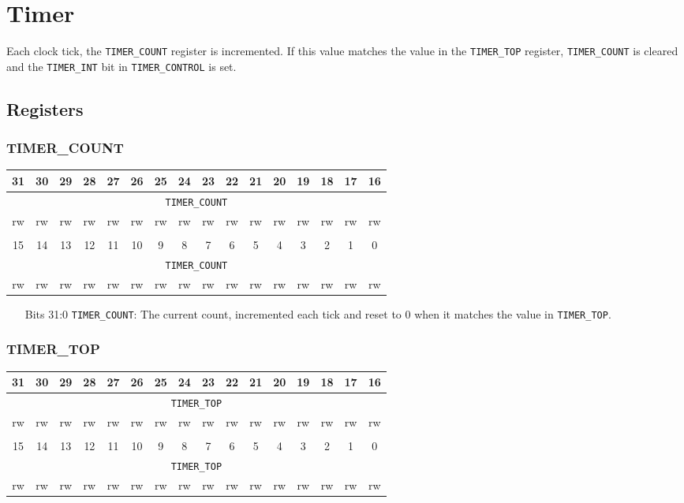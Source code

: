 \documentclass[11pt,openany]{report}
\begin{document}
\section{Timer}
Each clock tick, the \verb|TIMER_COUNT| register is incremented. If
this value matches the value in the \verb|TIMER_TOP| register,
\verb|TIMER_COUNT| is cleared and the \verb|TIMER_INT| bit in
\verb|TIMER_CONTROL| is set.

\subsection{Registers}
\subsubsection{TIMER\_COUNT}

\centering
\begin{tabular}{|c|c|c|c|c|c|c|c|c|c|c|c|c|c|c|c|}
  \hline
  31 & 30 & 29 & 28 & 27 & 26 & 25 & 24 & 23 & 22 & 21 & 20 & 19 & 18 & 17 & 16 \\
  \hline
  \multicolumn{16}{|c|}{\texttt{TIMER\_COUNT}}\\
  \hline
  rw & rw & rw & rw & rw & rw & rw & rw & rw & rw & rw & rw & rw & rw & rw & rw\\
  \hline
  \multicolumn{16}{c}{}\\
  \hline
  15 & 14 & 13 & 12 & 11 & 10 & 9 & 8 & 7 & 6 & 5 & 4 & 3 & 2 & 1 & 0 \\
  \hline
  \multicolumn{16}{|c|}{\texttt{TIMER\_COUNT}}\\
  \hline
  rw & rw & rw & rw & rw & rw & rw & rw & rw & rw & rw & rw & rw & rw & rw & rw\\
  \hline
\end{tabular}

\begin{enumerate}
\item[Bits 31:0] \verb|TIMER_COUNT|: The current count, incremented
  each tick and reset to 0 when it matches the value in
  \verb|TIMER_TOP|.
\end{enumerate}

\subsubsection{TIMER\_TOP}
\centering
\begin{tabular}{|c|c|c|c|c|c|c|c|c|c|c|c|c|c|c|c|}
  \hline
  31 & 30 & 29 & 28 & 27 & 26 & 25 & 24 & 23 & 22 & 21 & 20 & 19 & 18 & 17 & 16 \\
  \hline
  \multicolumn{16}{|c|}{\texttt{TIMER\_TOP}}\\
  \hline
  rw & rw & rw & rw & rw & rw & rw & rw & rw & rw & rw & rw & rw & rw & rw & rw\\
  \hline
  \multicolumn{16}{c}{}\\
  \hline
  15 & 14 & 13 & 12 & 11 & 10 & 9 & 8 & 7 & 6 & 5 & 4 & 3 & 2 & 1 & 0 \\
  \hline
  \multicolumn{16}{|c|}{\texttt{TIMER\_TOP}}\\
  \hline
  rw & rw & rw & rw & rw & rw & rw & rw & rw & rw & rw & rw & rw & rw & rw & rw\\
  \hline
\end{tabular}
\end{document}
